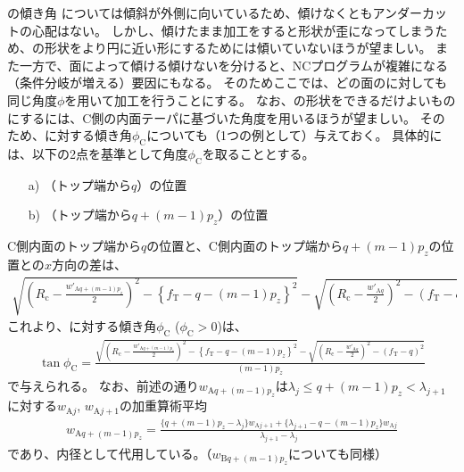 \begin{Column}{\CfaceDimple の傾き角}
\CfaceDimple については傾斜が外側に向いているため、傾けなくともアンダーカットの心配はない。
しかし、傾けたまま加工をすると形状が歪になってしまうため、\Dimple の形状をより円に近い形にするためには傾いていないほうが望ましい。
また一方で、面によって傾ける傾けないを分けると、NCプログラムが複雑になる（条件分岐が増える）要因にもなる。
そのためここでは、どの面の\Dimple に対しても同じ角度$\phi$を用いて加工を行うことにする。
\tcbline*
なお、\CfaceDimple の形状をできるだけよいものにするには、C側の内面テーパに基づいた角度を用いるほうが望ましい。
そのため、\CfaceDimple に対する傾き角$\phi_\mathrm C$についても（1つの例として）与えておく。
具体的には、以下の2点を基準として角度$\phi_\mathrm C$を取ることとする。
\begin{enumerate}
\item[a)] \CFaceDimpleFirstRow（トップ端から$q$）の位置
\item[b)] \CFaceDimpleLastRow（トップ端から$q+(m-1)p_z$）の位置
\end{enumerate}
C側内面のトップ端から$q$の位置と、C側内面のトップ端から$q+(m-1)p_z$の位置との$x$方向の差は、
\begin{align*}
  \sqrt{\left(R_\mathrm c-\frac{w'_{\mathrm Aq+(m-1)p_z}}2\right)^2
        -\left\{f_\mathrm T-q-(m-1)p_z\right\}^2}
  -\sqrt{\left(R_\mathrm c-\frac{w'_{\mathrm Aq}}2\right)^2-(f_\mathrm T-q)^2}
\end{align*}
これより、\CfaceDimple に対する傾き角$\phi_\mathrm C$ ($\phi_\mathrm C > 0$)は、
\begin{align*}
  \tan\phi_\mathrm C
  = \frac{\displaystyle
          \sqrt{\left(R_\mathrm c-\frac{w'_{\mathrm Aq+(m-1)p_z}}2\right)^2
                -\left\{f_\mathrm T-q-(m-1)p_z\right\}^2}
          -\sqrt{\left(R_\mathrm c-\frac{w'_{\mathrm Aq}}2\right)^2-(f_\mathrm T-q)^2}}
         {(m-1)p_z}
\end{align*}
で与えられる。
なお、前述の通り$w_{\mathrm Aq+(m-1)p_z}$は$\lambda_j \leq q+(m-1)p_z < \lambda_{j+1}$に対する$w_{\mathrm Aj}$, $w_{\mathrm Aj+1}$の加重算術平均
\begin{align*}
  w_{\mathrm Aq+(m-1)p_z}
  = \frac{\{q+(m-1)p_z-\lambda_j\}w_{\mathrm Aj+1}+\{\lambda_{j+1}-q-(m-1)p_z\}w_{\mathrm Aj}}
         {\lambda_{j+1}-\lambda_j}
\end{align*}
であり、内径として代用している。（$w_{\mathrm Bq+(m-1)p_z}$についても同様）
\end{Column}


